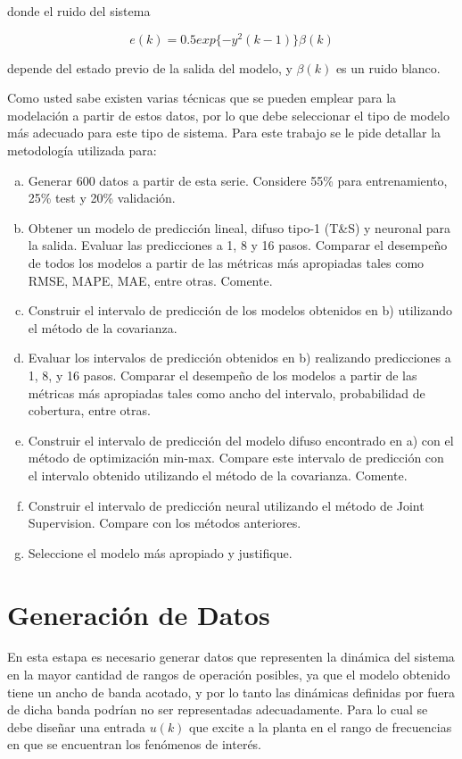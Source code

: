\documentclass[12pt]{article}
\begin{document}
donde el ruido del sistema

\begin{equation}
e(k)=  0.5 exp\{-y^2(k- 1)\}\beta(k)
\label{e_error}
\end{equation}

depende del estado previo de la salida del modelo, y $\beta(k)$ es un ruido blanco.

Como usted sabe existen varias técnicas que se pueden emplear para la modelación a partir de estos datos, por lo que debe seleccionar el tipo de modelo más adecuado para este tipo de sistema. Para este trabajo se le pide detallar la metodología utilizada para:

\begin{enumerate}[a)]
\item Generar 600 datos a partir de esta serie. Considere 55\% para entrenamiento, 25\% test y 20\% validación.
\item Obtener un modelo de predicción lineal, difuso tipo-1 (T\&S) y neuronal para la salida. Evaluar las predicciones a 1, 8 y 16 pasos. Comparar el desempeño de todos los modelos a partir de las métricas más apropiadas tales como RMSE, MAPE, MAE, entre otras. Comente.
\item Construir el intervalo de predicción de los modelos obtenidos en b) utilizando el método de la covarianza.
\item Evaluar los intervalos de predicción obtenidos en b) realizando predicciones a 1, 8, y 16 pasos. Comparar el desempeño de los modelos a partir de las métricas más apropiadas tales como ancho del intervalo, probabilidad de cobertura, entre otras.
\item Construir el intervalo de predicción del modelo difuso encontrado en a) con el método de optimización min-max. Compare este intervalo de predicción con el intervalo obtenido utilizando el método de la covarianza. Comente.
\item Construir el intervalo de predicción neural utilizando el método de Joint Supervision. Compare con los métodos anteriores.
\item Seleccione el modelo más apropiado y justifique.
\end{enumerate}

\newpage
\section{Generación de Datos}

En esta estapa es necesario generar datos que representen la dinámica del sistema en la mayor cantidad de rangos de operación posibles, ya que el modelo obtenido tiene un ancho de banda acotado, y por lo tanto las dinámicas definidas por fuera de dicha banda podrían no ser representadas adecuadamente. Para lo cual se debe diseñar una entrada $u(k)$ que excite a la planta en el rango de frecuencias en que se encuentran los fenómenos de interés.
\end{document}
